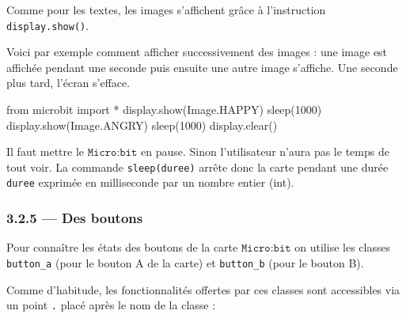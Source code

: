\documentclass[a4paper,17pt]{extarticle}
\newenvironment{Shaded}{}{}
\newcommand{\DecValTok}[1]{\textcolor[rgb]{0.25,0.63,0.44}{{#1}}}
\newcommand{\NormalTok}[1]{{#1}}
\newcommand{\ImportTok}[1]{{#1}}
\newcommand{\OperatorTok}[1]{\textcolor[rgb]{0.40,0.40,0.40}{{#1}}}
\begin{document}
Comme pour les textes, les images s'affichent grâce à l'instruction
\texttt{display.show()}.
\begin{exemple}
    Voici par exemple comment afficher successivement des images : une image
est affichée pendant une seconde puis ensuite une autre image s'affiche.
Une seconde plus tard, l'écran s'efface.

\begin{Shaded}
\begin{Highlighting}[]
\ImportTok{from}\NormalTok{ microbit }\ImportTok{import} \OperatorTok{*}
\NormalTok{display.show(Image.HAPPY)}
\NormalTok{sleep(}\DecValTok{1000}\NormalTok{)}
\NormalTok{display.show(Image.ANGRY)}
\NormalTok{sleep(}\DecValTok{1000}\NormalTok{)}
\NormalTok{display.clear()}
\end{Highlighting}
\end{Shaded}

Il faut mettre le \(\texttt{Micro:bit}\) en pause. Sinon l'utilisateur
n'aura pas le temps de tout voir. La commande \texttt{sleep(duree)}
arrête donc la carte pendant une durée \texttt{duree} exprimée en
milliseconde par un nombre entier (int).

        \end{exemple}
    \hypertarget{des-boutons}{%
\subsubsection{3.2.5 --- Des boutons}\label{des-boutons}}

    Pour connaître les états des boutons de la carte \(\texttt{Micro:bit}\)
on utilise les classes \texttt{button\_a} (pour le bouton A de la carte)
et \texttt{button\_b} (pour le bouton B).

Comme d'habitude, les fonctionnalités offertes par ces classes sont
accessibles via un point \texttt{\textquotesingle{}.\textquotesingle{}}
placé après le nom de la classe :
\end{document}
